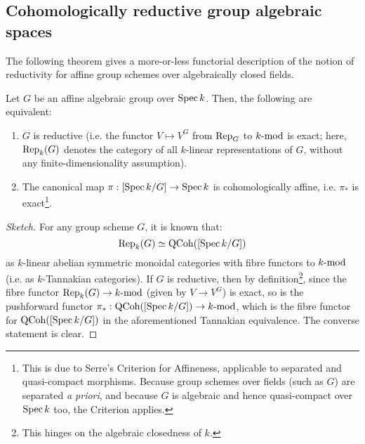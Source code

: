         \subsection{Cohomologically reductive group algebraic spaces}
            The following theorem gives a more-or-less functorial description of the notion of reductivity for affine group schemes over algebraically closed fields.
            \begin{theorem}
                Let $G$ be an affine algebraic group over $\Spec k$. Then, the following are equivalent:
                \begin{enumerate}
                    \item $G$ is reductive (i.e. the functor $V \mapsto V^G$ from $\Rep_G$ to $k\mod$ is exact; here, $\Rep_k(G)$ denotes the category of all $k$-linear representations of $G$, without any finite-dimensionality assumption).
                    \item The canonical map $\pi: [\Spec k/G] \to \Spec k$ is cohomologically affine, i.e. $\pi_*$ is exact\footnote{This is due to Serre's Criterion for Affineness, applicable to separated and quasi-compact morphisms. Because group schemes over fields (such as $G$) are separated \textit{a priori}, and because $G$ is algebraic and hence quasi-compact over $\Spec k$ too, the Criterion applies.}.
                \end{enumerate}
            \end{theorem}
                \begin{proof}[Sketch]
                    For any group scheme $G$, it is known that:
                        $$\Rep_k(G) \cong \QCoh([\Spec k/G])$$
                    as $k$-linear abelian symmetric monoidal categories with fibre functors to $k\mod$ (i.e. as $k$-Tannakian categories). If $G$ is reductive, then by definition\footnote{This hinges on the algebraic closedness of $k$.}, since the fibre functor $\Rep_k(G) \to k\mod$ (given by $V \to V^G$) is exact, so is the pushforward functor $\pi_*: \QCoh([\Spec k/G]) \to k\mod$, which is the fibre functor for $\QCoh([\Spec k/G])$ in the aforementioned Tannakian equivalence. The converse statement is clear. 
                \end{proof}
